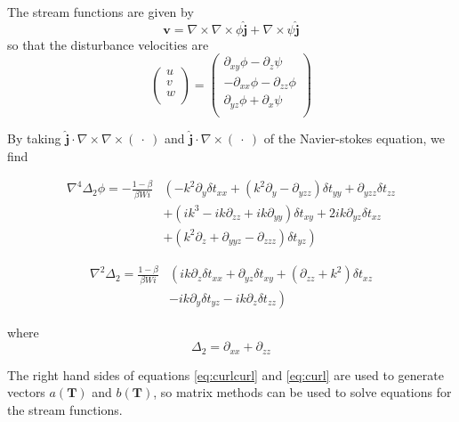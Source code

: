 \documentclass[12pt,a4paper]{article}
\newcommand{\stxx}{\delta t_{xx}}
\newcommand{\styy}{\delta t_{yy}}
\newcommand{\stzz}{\delta t_{zz}}
\newcommand{\stxy}{\delta t_{xy}}
\newcommand{\stxz}{\delta t_{xz}}
\newcommand{\styz}{\delta t_{yz}}
\newcommand{\curl}{\nabla \times}
\newcommand{\biharmop}{\nabla^{4}}
\newcommand{\dd}[1]{\partial_{#1}}
\begin{document}
The stream functions are given by 
\begin{equation}
    \mathbf{v} = \curl \curl \phi \hat{\mathbf{j}} + \curl \psi\hat{\mathbf{j}}
\end{equation}
so that the disturbance velocities are
\begin{equation}
    \begin{pmatrix}
	u \\
	v \\
	w \\
    \end{pmatrix}
    =
    \begin{pmatrix}
    \partial _{xy} \phi - \partial_{z} \psi \\
    -\partial_{xx} \phi - \partial_{zz} \phi \\
    \partial _{yz} \phi + \partial_{x} \psi \\
    \end{pmatrix}
    \label{eq:streamfunction_def}
\end{equation}

By taking $\hat{\mathbf{j}} \cdot \curl \curl (~ \cdot ~) $ and $\hat{\mathbf{j}} \cdot \curl (~ \cdot ~)$ of the Navier-stokes equation, we find

\begin{align}
    \biharmop  \Delta_{2} \phi = - \frac{1-\beta}{\beta Wi} &\left(-k^{2}\dd{y} \stxx + (k^{2}\dd{y} - \dd{yzz})\styy + \dd{yzz} \stzz \right. \nonumber \\ 
   & \left. + (ik^{3} - ik\dd{zz} + ik\dd{yy}) \stxy + 2ik\dd{yz}\stxz \right. \nonumber \\
   & \left. + (k^{2}\dd{z} + \dd{yyz} - \dd{zzz})\styz \right)
\label{eq:curlcurl}
\end{align}

\begin{align}
    \nabla ^{2} \Delta_{2} = \frac{1-\beta}{\beta Wi} &\left( ik\dd{z}\stxx +\dd{yz} \stxy + (\dd{zz} +k^{2})\stxz \right. \nonumber \\ 
    & \left. - ik\dd{y} \styz - ik\dd{z} \stzz \right)
\label{eq:curl}
\end{align}

where
\begin{equation}
    \Delta_{2} = \dd{xx} + \dd{zz}
\end{equation}

The right hand sides of equations \ref{eq:curlcurl} and \ref{eq:curl} are used to generate vectors $a(\mathbf{T})$ and  $b(\mathbf{T})$, so matrix methods can be used to solve equations for the stream functions.
\end{document}
